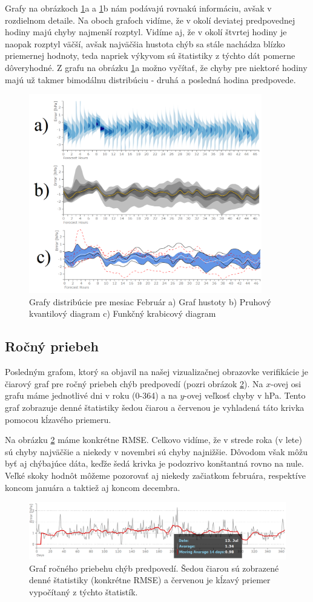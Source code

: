 Grafy na obrázkoch \ref{fig:distrib}a a \ref{fig:distrib}b nám podávajú rovnakú informáciu, avšak v rozdielnom detaile. Na oboch grafoch vidíme, že v okolí deviatej predpovednej hodiny majú chyby najmenší rozptyl. Vidíme aj, že v okolí štvrtej hodiny je naopak rozptyl väčší, avšak najväčšia hustota chýb sa stále nachádza blízko priemernej hodnoty, teda napriek výkyvom sú štatistiky z týchto dát pomerne dôveryhodné. Z grafu na obrázku \ref{fig:distrib}a možno vyčítať, že chyby pre niektoré hodiny majú už takmer bimodálnu distribúciu - druhá a posledná hodina predpovede.


\begin{figure}
	\centering
	\includegraphics[width = 4in]{distrib}
	\caption{Grafy distribúcie pre mesiac Február a) Graf hustoty b) Pruhový kvantilový diagram c) Funkčný krabicový diagram}
	\label{fig:distrib} 
\end{figure}

\subsection{Ročný priebeh}
Posledným grafom, ktorý sa objavil na našej vizualizačnej obrazovke verifikácie je čiarový graf pre ročný priebeh chýb predpovedí (pozri obrázok \ref{fig:progress}). Na \mbox{$ x $-ovej} osi grafu máme jednotlivé dni v roku (0-364) a na \mbox{$ y $-ovej} veľkosť chyby v hPa. Tento graf zobrazuje denné štatistiky šedou čiarou a červenou je vyhladená táto krivka pomocou kĺzavého priemeru.

Na obrázku \ref{fig:progress} máme konkrétne RMSE. Celkovo vidíme, že v strede roka (v lete) sú chyby najväčšie a niekedy v novembri sú chyby najnižšie. Dôvodom však môžu byť aj chýbajúce dáta, keďže šedá krivka je podozrivo konštantná rovno na nule. Veľké skoky hodnôt môžeme pozorovať aj niekedy začiatkom februára, respektíve koncom januára a taktiež aj koncom decembra.


\begin{figure}
	\centering
	\includegraphics[width = 6in]{progress}
	\caption{Graf ročného priebehu chýb predpovedí. Šedou čiarou sú zobrazené denné štatistiky (konkrétne RMSE) a červenou je kĺzavý priemer vypočítaný z týchto štatistík. }
	\label{fig:progress} 
\end{figure}